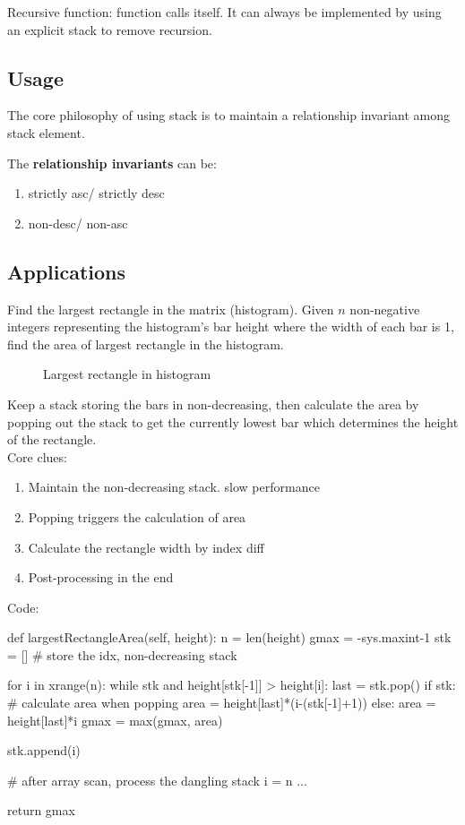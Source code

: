 Recursive function: function calls itself. It can always be implemented by using an explicit stack to remove recursion. 

\subsection{Usage}
The core philosophy of using stack is to maintain a relationship invariant among stack element. 

The \textbf{relationship invariants} can be:
\begin{enumerate}
\item strictly asc/ strictly desc
\item non-desc/ non-asc
\end{enumerate}

\subsection{Applications}
 Find the largest rectangle in the matrix (histogram). Given $n$ non-negative integers representing the histogram's bar height where the width of each bar is 1, find the area of largest rectangle in the histogram. 

\begin{figure}[hbtp]
\centering
{}
\caption{Largest rectangle in histogram}
\label{fig:histogram_area}
\end{figure}

Keep a stack storing the bars in non-decreasing, then calculate the area by popping out the stack to get the currently lowest bar which determines the height of the rectangle.
\\
Core clues:
\begin{enumerate}
\item Maintain the non-decreasing stack. slow performance 
\item Popping triggers the calculation of area
\item Calculate the rectangle width by index diff
\item Post-processing in the end
\end{enumerate}
\newpage
Code:
\begin{python}
def largestRectangleArea(self, height):
    n = len(height)
    gmax = -sys.maxint-1
    stk = []  # store the idx, non-decreasing stack

    for i in xrange(n):
        while stk and height[stk[-1]] > height[i]:
            last = stk.pop()
            if stk:  # calculate area when popping
                area = height[last]*(i-(stk[-1]+1))
            else:
                area = height[last]*i
            gmax = max(gmax, area)

        stk.append(i)

    # after array scan, process the dangling stack
    i = n
    ...

    return gmax
\end{python}

